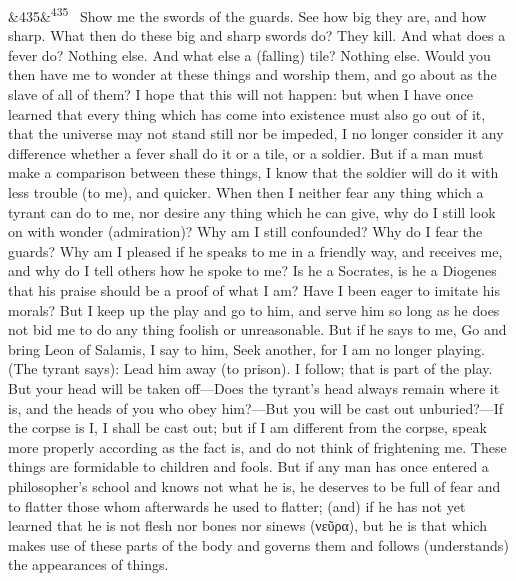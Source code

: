 \documentclass[12pt]{article}
\newcommand{\para}[1][]{\par\noindent\ifx&#1&\else\textsuperscript{\footnotesize #1}~\fi}
\begin{document}
\para[435] Show me the swords of the guards. See how big they are, and how sharp. What then do these big and sharp swords do? They kill. And what does a fever do? Nothing else. And what else a (falling) tile? Nothing else. Would you then have me to wonder at these things and worship them, and go about as the slave of all of them? I hope that this will not happen: but when I have once learned that every thing which has come into existence must also go out of it, that the universe may not stand still nor be impeded, I no longer consider it any difference whether a fever shall do it or a tile, or a soldier. But if a man must make a comparison between these things, I know that the soldier will do it with less trouble (to me), and quicker. When then I neither fear any thing which a tyrant can do to me, nor desire any thing which he can give, why do I still look on with wonder (admiration)? Why am I still confounded? Why do I fear the guards? Why am I pleased if he speaks to me in a friendly way, and receives me, and why do I tell others how he spoke to me? Is he a Socrates, is he a Diogenes that his praise should be a proof of what I am? Have I been eager to imitate his morals? But I keep up the play and go to him, and serve him so long as he does not bid me to do any thing foolish or unreasonable. But if he says to me, Go and bring Leon of Salamis, I say to him, Seek another, for I am no longer playing. (The tyrant says): Lead him away (to prison). I follow; that is part of the play. But your head will be taken off—Does the tyrant's head always remain where it is, and the heads of you who obey him?—But you will be cast out unburied?—If the corpse is I, I shall be cast out; but if I am different from the corpse, speak more properly according as the fact is, and do not think of frightening me. These things are formidable to children and fools. But if any man has once entered a philosopher's school and knows not what he is, he deserves to be full of fear and to flatter those whom afterwards he used to flatter; (and) if he has not yet learned that he is not flesh nor bones nor sinews (νεῦρα), but he is that which makes use of these parts of the body and governs them and follows (understands) the appearances of things.
\end{document}
